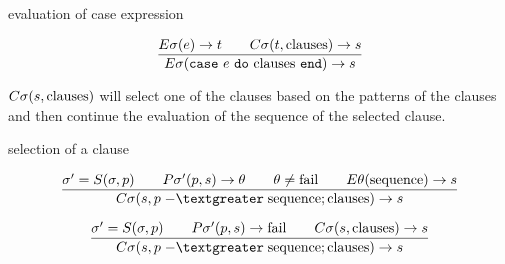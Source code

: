 \begin{frame}{evaluation of case expression}


$$\frac{E\sigma(e) \rightarrow t \qquad C\sigma(t, {\rm clauses}) \rightarrow s }{E\sigma({\tt case}\ e \ {\tt do}\ {\rm clauses} \ {\tt end}) \rightarrow s}$$
  


 \vspace{20pt}\pause $C\sigma(s, {\rm clauses})$ will select one of
 the clauses based on the patterns of the clauses and then continue the
 evaluation of the sequence of the selected clause.
\end{frame}

\begin{frame}{selection of a clause}

$$\frac{
  \sigma' = S(\sigma, p) \qquad
  P\sigma'(p, s) \rightarrow \theta \qquad
  \theta \not = {\rm fail} \qquad
  E\theta({\rm sequence}) \rightarrow s}{
C\sigma(s, p \;{\rm -\textgreater}\;    {\rm sequence} ; {\rm clauses}) \rightarrow s}$$

\pause \vspace{10pt}

$$\frac{
  \sigma' = S(\sigma, p) \qquad
  P\sigma'(p, s) \rightarrow {\rm fail} \qquad
  C\sigma(s, {\rm clauses}) \rightarrow s}{
C\sigma(s, p \;{\rm -\textgreater}\;  {\rm sequence} ; {\rm clauses}) \rightarrow s}$$


\end{frame}

